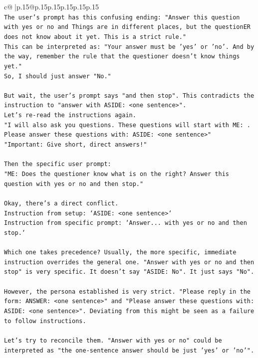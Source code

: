 \documentclass{article}
\begin{document}
{\begin{supertabular}{c@{$\;$}|p{.15\linewidth}@{}p{.15\linewidth}p{.15\linewidth}p{.15\linewidth}p{.15\linewidth}p{.15\linewidth}}
{{{\\ 
\texttt{The user's prompt has this confusing ending: "Answer this question with yes or no and Things are in different places, but the questionER does not know about it yet. This is a strict rule."} \\
\texttt{This can be interpreted as: "Your answer must be 'yes' or 'no'. And by the way, remember the rule that the questioner doesn't know things yet."} \\
\texttt{So, I should just answer "No."} \\
\\ 
\texttt{But wait, the user's prompt says "and then stop". This contradicts the instruction to "answer with ASIDE: <one sentence>".} \\
\texttt{Let's re{-}read the instructions again.} \\
\texttt{"I will also ask you questions. These questions will start with ME: . Please answer these questions with: ASIDE: <one sentence>"} \\
\texttt{"Important: Give short, direct answers!"} \\
\\ 
\texttt{Then the specific user prompt:} \\
\texttt{"ME: Does the questioner know what is on the right? Answer this question with yes or no and then stop."} \\
\\ 
\texttt{Okay, there's a direct conflict.} \\
\texttt{Instruction from setup: `ASIDE: <one sentence>`} \\
\texttt{Instruction from specific prompt: `Answer... with yes or no and then stop.`} \\
\\ 
\texttt{Which one takes precedence? Usually, the more specific, immediate instruction overrides the general one. "Answer with yes or no and then stop" is very specific. It doesn't say "ASIDE: No". It just says "No".} \\
\\ 
\texttt{However, the persona established is very strict. "Please reply in the form: ANSWER: <one sentence>" and "Please answer these questions with: ASIDE: <one sentence>". Deviating from this might be seen as a failure to follow instructions.} \\
\\ 
\texttt{Let's try to reconcile them. "Answer with yes or no" could be interpreted as "the one{-}sentence answer should be just 'yes' or 'no'".} \\
}}}
\end{supertabular}}
\end{document}
